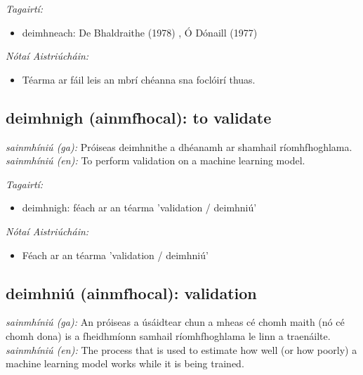 \documentclass{article}
\begin{document}
 \noindent \textit{Tagairtí:}
\begin{itemize}
	\item deimhneach: De Bhaldraithe (1978) \cite{de-bhaldraithe}, Ó Dónaill (1977) \cite{odonaill}
\end{itemize}

 \noindent \textit{Nótaí Aistriúcháin:}
\begin{itemize}
	\item Téarma ar fáil leis an mbrí chéanna sna foclóirí thuas.
\end{itemize}


\subsection*{deimhnigh (ainmfhocal): to validate} 
 \noindent \textit{sainmhíniú (ga):} Próiseas deimhnithe a dhéanamh ar shamhail ríomhfhoghlama.
\newline\newline
 \noindent \textit{sainmhíniú (en):} To perform validation on a machine learning model.
\newline

 \noindent \textit{Tagairtí:}
\begin{itemize}
	\item deimhnigh: féach ar an téarma 'validation / deimhniú'
\end{itemize}

 \noindent \textit{Nótaí Aistriúcháin:}
\begin{itemize}
	\item Féach ar an téarma 'validation / deimhniú'
\end{itemize}


\subsection*{deimhniú (ainmfhocal): validation} 
 \noindent \textit{sainmhíniú (ga):} An próiseas a úsáidtear chun a mheas cé chomh maith (nó cé chomh dona) is a fheidhmíonn samhail ríomhfhoghlama le linn a traenáilte.
\newline\newline
 \noindent \textit{sainmhíniú (en):} The process that is used to estimate how well (or how poorly) a machine learning model works while it is being trained.
\newline
\end{document}
